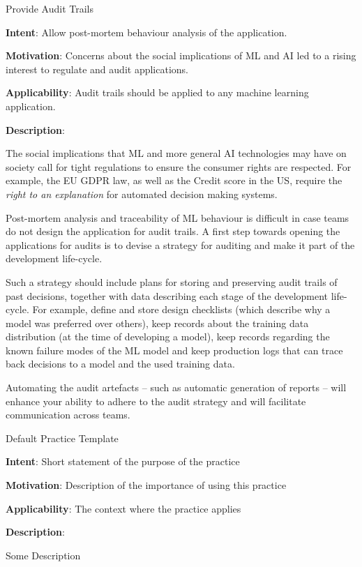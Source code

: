   
  \begin{frame}[plain]{ Provide Audit Trails
 }

  \textbf{Intent}: Allow post-mortem behaviour analysis of the application. 
 

  \textbf{Motivation}: Concerns about the social implications of ML and AI led to a rising interest to regulate and audit applications. 
 

  \textbf{Applicability}: Audit trails should be applied to any machine learning application.  
 

  \textbf{Description}: 

The social implications that ML and more general AI technologies may have on society call for tight regulations to ensure the consumer rights are respected. For example, the EU GDPR law, as well as the Credit score in the US, require the \emph{right to an explanation} for automated decision making systems.


Post-mortem analysis and traceability of ML behaviour is difficult in case teams do not design the application for audit trails.
A first step towards opening the applications for audits is to devise a strategy for auditing and make it part of the development life-cycle.


Such a strategy should include plans for storing and preserving audit trails of past decisions, together with data describing each stage of the development life-cycle.
For example, define and store design checklists (which describe why a model was preferred over others), keep records about the training data distribution (at the time of developing a model), keep records regarding the known failure modes of the ML model and keep production logs that can trace back decisions to a model and the used training data.


Automating the audit artefacts -- such as automatic generation of reports -- will enhance your ability to adhere to the audit strategy and will facilitate communication across teams.


 


  \end{frame}

  
  \begin{frame}[plain]{ Default Practice Template
 }

  \textbf{Intent}: Short statement of the purpose of the practice 
 

  \textbf{Motivation}: Description of the importance of using this practice 
 

  \textbf{Applicability}: The context where the practice applies 
 

  \textbf{Description}: 

Some Description


 


  \end{frame}

